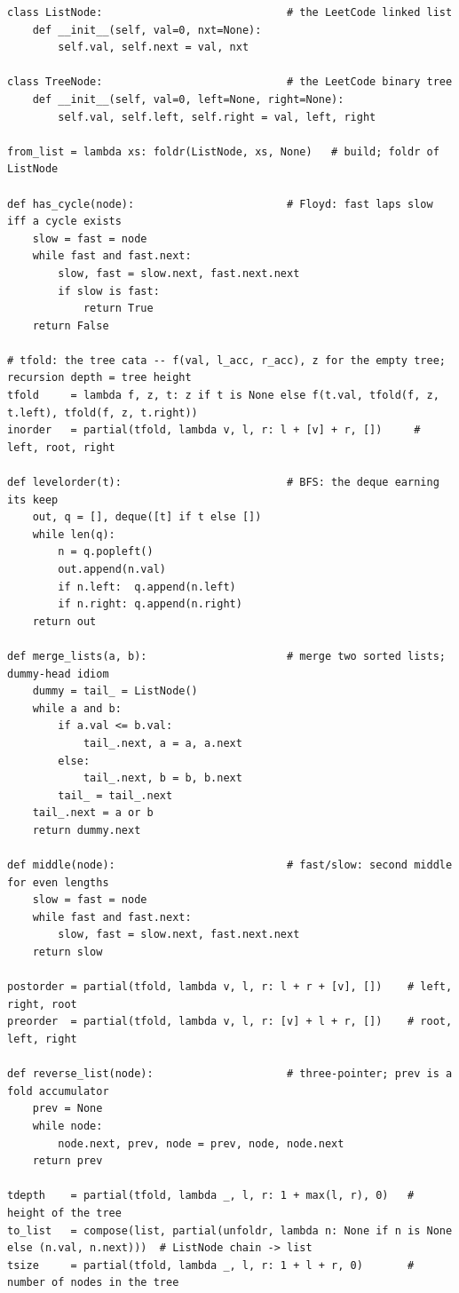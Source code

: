 \documentclass[10pt,letterpaper]{book}
\begin{document}
\begin{lstlisting}[style=file]
class ListNode:                             # the LeetCode linked list
    def __init__(self, val=0, nxt=None):
        self.val, self.next = val, nxt

class TreeNode:                             # the LeetCode binary tree
    def __init__(self, val=0, left=None, right=None):
        self.val, self.left, self.right = val, left, right

from_list = lambda xs: foldr(ListNode, xs, None)   # build; foldr of ListNode

def has_cycle(node):                        # Floyd: fast laps slow iff a cycle exists
    slow = fast = node
    while fast and fast.next:
        slow, fast = slow.next, fast.next.next
        if slow is fast:
            return True
    return False

# tfold: the tree cata -- f(val, l_acc, r_acc), z for the empty tree; recursion depth = tree height
tfold     = lambda f, z, t: z if t is None else f(t.val, tfold(f, z, t.left), tfold(f, z, t.right))
inorder   = partial(tfold, lambda v, l, r: l + [v] + r, [])     # left, root, right

def levelorder(t):                          # BFS: the deque earning its keep
    out, q = [], deque([t] if t else [])
    while len(q):
        n = q.popleft()
        out.append(n.val)
        if n.left:  q.append(n.left)
        if n.right: q.append(n.right)
    return out

def merge_lists(a, b):                      # merge two sorted lists; dummy-head idiom
    dummy = tail_ = ListNode()
    while a and b:
        if a.val <= b.val:
            tail_.next, a = a, a.next
        else:
            tail_.next, b = b, b.next
        tail_ = tail_.next
    tail_.next = a or b
    return dummy.next

def middle(node):                           # fast/slow: second middle for even lengths
    slow = fast = node
    while fast and fast.next:
        slow, fast = slow.next, fast.next.next
    return slow

postorder = partial(tfold, lambda v, l, r: l + r + [v], [])    # left, right, root
preorder  = partial(tfold, lambda v, l, r: [v] + l + r, [])    # root, left, right

def reverse_list(node):                     # three-pointer; prev is a fold accumulator
    prev = None
    while node:
        node.next, prev, node = prev, node, node.next
    return prev

tdepth    = partial(tfold, lambda _, l, r: 1 + max(l, r), 0)   # height of the tree
to_list   = compose(list, partial(unfoldr, lambda n: None if n is None else (n.val, n.next)))  # ListNode chain -> list
tsize     = partial(tfold, lambda _, l, r: 1 + l + r, 0)       # number of nodes in the tree


\end{lstlisting}
\end{document}
